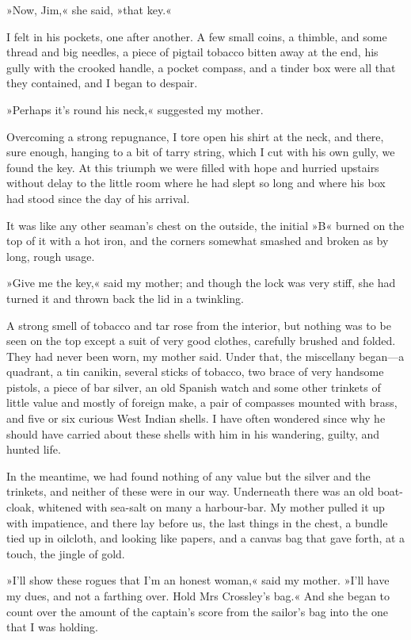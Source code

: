»Now, Jim,« she said, »that key.«

I felt in his pockets, one after another. A few small coins, a thimble, and some thread and big needles, a piece of pigtail tobacco bitten away at the end, his gully with the crooked handle, a pocket compass, and a tinder box were all that they contained, and I began to despair.

»Perhaps it's round his neck,« suggested my mother.

Overcoming a strong repugnance, I tore open his shirt at the neck, and there, sure enough, hanging to a bit of tarry string, which I cut with his own gully, we found the key. At this triumph we were filled with hope and hurried upstairs without delay to the little room where he had slept so long and where his box had stood since the day of his arrival.

It was like any other seaman's chest on the outside, the initial »B« burned on the top of it with a hot iron, and the corners somewhat smashed and broken as by long, rough usage.

»Give me the key,« said my mother; and though the lock was very stiff, she had turned it and thrown back the lid in a twinkling.

A strong smell of tobacco and tar rose from the interior, but nothing was to be seen on the top except a suit of very good clothes, carefully brushed and folded. They had never been worn, my mother said. Under that, the miscellany began—a quadrant, a tin canikin, several sticks of tobacco, two brace of very handsome pistols, a piece of bar silver, an old Spanish watch and some other trinkets of little value and mostly of foreign make, a pair of compasses mounted with brass, and five or six curious West Indian shells. I have often wondered since why he should have carried about these shells with him in his wandering, guilty, and hunted life.

In the meantime, we had found nothing of any value but the silver and the trinkets, and neither of these were in our way. Underneath there was an old boat-cloak, whitened with sea-salt on many a harbour-bar. My mother pulled it up with impatience, and there lay before us, the last things in the chest, a bundle tied up in oilcloth, and looking like papers, and a canvas bag that gave forth, at a touch, the jingle of gold.

»I'll show these rogues that I'm an honest woman,« said my mother. »I'll have my dues, and not a farthing over. Hold Mrs Crossley's bag.« And she began to count over the amount of the captain's score from the sailor's bag into the one that I was holding.

